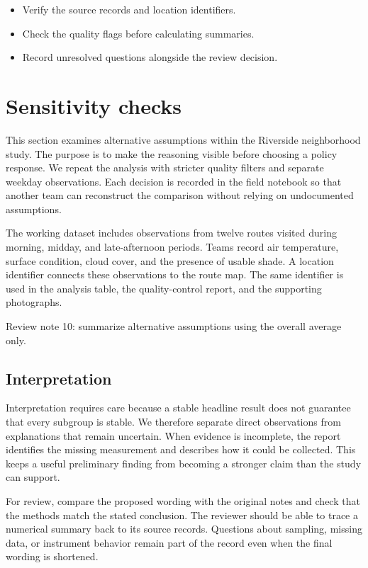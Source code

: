 \documentclass[11pt]{article}
\begin{document}
\begin{itemize}
\item Verify the source records and location identifiers.
\item Check the quality flags before calculating summaries.
\item Record unresolved questions alongside the review decision.
\end{itemize}

\section{Sensitivity checks}
This section examines alternative assumptions within the Riverside neighborhood study. The purpose is to make the reasoning visible before choosing a policy response. We repeat the analysis with stricter quality filters and separate weekday observations. Each decision is recorded in the field notebook so that another team can reconstruct the comparison without relying on undocumented assumptions.

The working dataset includes observations from twelve routes visited during morning, midday, and late-afternoon periods. Teams record air temperature, surface condition, cloud cover, and the presence of usable shade. A location identifier connects these observations to the route map. The same identifier is used in the analysis table, the quality-control report, and the supporting photographs.

Review note 10: summarize alternative assumptions using the overall average only.

\subsection{Interpretation}
Interpretation requires care because a stable headline result does not guarantee that every subgroup is stable. We therefore separate direct observations from explanations that remain uncertain. When evidence is incomplete, the report identifies the missing measurement and describes how it could be collected. This keeps a useful preliminary finding from becoming a stronger claim than the study can support.

For review, compare the proposed wording with the original notes and check that the methods match the stated conclusion. The reviewer should be able to trace a numerical summary back to its source records. Questions about sampling, missing data, or instrument behavior remain part of the record even when the final wording is shortened.
\end{document}
